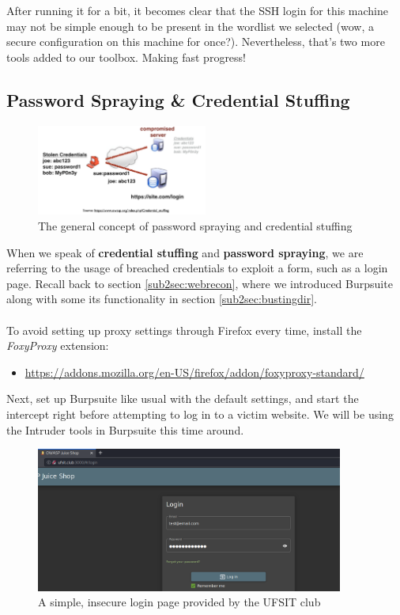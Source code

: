 \documentclass[a4paper,11pt]{article}
\renewcommand{\tt}[2][tt]{\textcolor{#1}{\ttfamily #2}}%
\begin{document}
After running it for a bit, it becomes clear that the SSH login for this machine may not be simple enough to be present in the wordlist we selected (wow, a secure configuration on this machine for once?). Nevertheless, that's two more tools added to our toolbox. Making fast progress!
\pagebreak

\subsection{Password Spraying \& Credential Stuffing}

\begin{figure}[h]
    \centering
    \includegraphics[width=0.5\textwidth]{images/spraying-stuffing-diagram.png}
    \caption{The general concept of password spraying and credential stuffing}
\end{figure}

When we speak of {\bfseries credential stuffing} and {\bfseries password spraying}, we are referring to the usage of breached credentials to exploit a form, such as a login page. Recall back to section \ref{sub2sec:webrecon}, where we introduced Burpsuite along with some its functionality in section \ref{sub2sec:bustingdir}.
\\
\\
To avoid setting up proxy settings through Firefox every time, install the \textit{FoxyProxy} extension:
\begin{itemize}
    \item \url{https://addons.mozilla.org/en-US/firefox/addon/foxyproxy-standard/}
\end{itemize}
Next, set up Burpsuite like usual with the default settings, and start the \tt{intercept} right before attempting to log in to a victim website. We will be using the \tt{Intruder} tools in Burpsuite this time around.

\begin{figure}[h]
    \vspace{1cm}
    \centering
    \includegraphics[width=0.9\textwidth]{images/sample-login-page.png}
    \caption{A simple, insecure login page provided by the UFSIT club}
    \label{sample-login-page}
\end{figure}
\pagebreak
\end{document}
